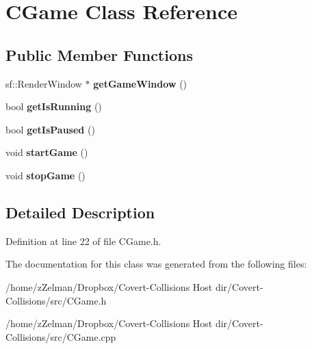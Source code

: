 \hypertarget{classCGame}{\section{C\-Game Class Reference}
\label{classCGame}
}
\subsection*{Public Member Functions}
\begin{DoxyCompactItemize}
\item 
\hypertarget{classCGame_a9ed0bb7ef800bc7e568cf8858c3b96ec}{sf\-::\-Render\-Window $\ast$ {\bfseries get\-Game\-Window} ()}\label{classCGame_a9ed0bb7ef800bc7e568cf8858c3b96ec}

\item 
\hypertarget{classCGame_ae45938d7b77b13d2e80e4f9b3a17a44a}{bool {\bfseries get\-Is\-Running} ()}\label{classCGame_ae45938d7b77b13d2e80e4f9b3a17a44a}

\item 
\hypertarget{classCGame_a9b2f241693b1f024c957f92069fe6ed7}{bool {\bfseries get\-Is\-Paused} ()}\label{classCGame_a9b2f241693b1f024c957f92069fe6ed7}

\item 
\hypertarget{classCGame_aa94f04e2c012603f10430a4d4db3ce27}{void {\bfseries start\-Game} ()}\label{classCGame_aa94f04e2c012603f10430a4d4db3ce27}

\item 
\hypertarget{classCGame_acbad86ee58748e2db0da540f4aa0640e}{void {\bfseries stop\-Game} ()}\label{classCGame_acbad86ee58748e2db0da540f4aa0640e}

\end{DoxyCompactItemize}


\subsection{Detailed Description}


Definition at line 22 of file C\-Game.\-h.



The documentation for this class was generated from the following files\-:\begin{DoxyCompactItemize}
\item 
/home/z\-Zelman/\-Dropbox/\-Covert-\/\-Collisions Host dir/\-Covert-\/\-Collisions/src/C\-Game.\-h\item 
/home/z\-Zelman/\-Dropbox/\-Covert-\/\-Collisions Host dir/\-Covert-\/\-Collisions/src/C\-Game.\-cpp\end{DoxyCompactItemize}
